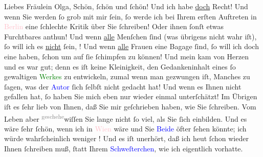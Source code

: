 \pstart\center{}Liebes Fräulein Olga,\pend
\pstart
           Schön, ſchön und ſchön! Und ich habe \uline{doch} Recht! Und
               wenn Sie werden ſo grob mit mir ſein, ſo werde ich bei Ihrem erſten Auftreten in \textcolor{pink}{Berlin}{}\ledrightnote{\textcolor{pink}{Berlin}} eine ſchlechte Kritik über Sie ſchreiben!
               Oder ihnen ſonſt etwas Furchtbares anthun! Und wenn \uline{alle} Menſchen \label{K_L03525-1v}\label{K_L03525-1h} ſind (was übrigens nicht wahr iſt), ſo will ich es \uline{nicht} ſein, \label{K_L03525-2v}\label{K_L03525-2h}! Und wenn \uline{alle}
               Frauen eine Bagage ſind, ſo will ich doch eine haben, ſchon um auf {\pb}ſie ſchimpfen zu können! Und mein \label{K_L03525-3v}\label{K_L03525-3h} kam
               von Herzen und es war gut; denn es iſt \strikeout{\textcolor{gray}{Ar}} keine Kleinigkeit, den Gedankeninhalt eines ſo gewaltigen \textcolor{green}{Werkes}{}\ledrightnote{{$\rightarrow$}\textcolor{green}{Über unsere Kraft. Zweiter Teil}} zu
               entwickeln, zumal wenn man gezwungen iſt, Manches zu ſagen, was der \textcolor{blue}{Autor}{}\ledrightnote{{$\rightarrow$}\textcolor{blue}{Bjørnstjerne Bjørnson}} ſich ſelbſt nicht gedacht hat! Und
               wenn es Ihnen  nicht gefallen hat, ſo haben Sie mich eben nur wieder einmal unterſchätzt! Im
               Übrigen iſt es  ſehr lieb
               von Ihnen, daß Sie mir geſchrieben haben, wie Sie ſchreiben. Vom Leben aber {\pb}\substVorne{}\textsuperscript{\textcolor{gray}{geschehe}}{\allowbreak}\substDazwischen{}wiſſen\substHinten{} Sie lange nicht ſo viel, als Sie ſich einbilden. Und es wäre ſehr ſchön,
               wenn ich in \textcolor{pink}{Wien}{}\ledrightnote{\textcolor{pink}{Wien}} wäre und Sie \textcolor{blue}{Beide}{}\ledrightnote{{$\rightarrow$}} öfter ſehen könnte; ich würde
               wahrſcheinlich weniger \label{K_L03525-4v}\label{K_L03525-4h}! Und es iſt unerhört, daß ich heut ſchon
               wieder Ihnen ſchreiben muß, ſtatt Ihrem \textcolor{blue}{Schweſterchen}{}\ledrightnote{{$\rightarrow$}\textcolor{blue}{Elisabeth Steinrück}}, wie ich eigentlich vorhatte.\pend
           
